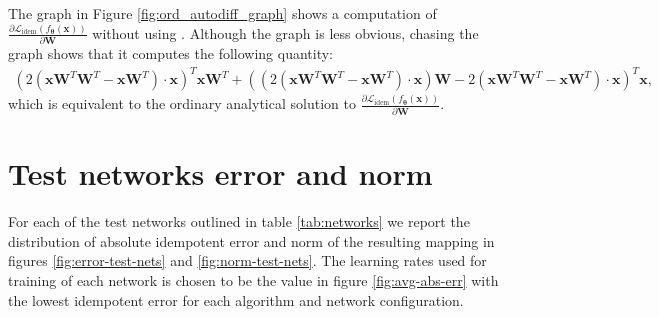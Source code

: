 \documentclass{article}
\theoremstyle{plain}
\theoremstyle{definition}
\theoremstyle{remark}
\newcommand{\vx}{\mathbf{x}}
\newcommand{\vW}{\mathbf{W}}
\newcommand{\vtheta}{\bm{\theta}}
\newcommand{\pd}[2]{\frac{\partial{#1}}{\partial{#2}}}
\begin{document}
The graph in Figure \ref{fig:ord_autodiff_graph} shows a computation of $\pd{\mathcal{L}_{\mathrm{idem}}(f_{\vtheta}(\vx))}{\vW}$ without using . Although the graph is less obvious, chasing the graph shows that it computes the following quantity:
%
\begin{align*}
    (2(\vx\vW^T\vW^T-\vx\vW^T) \cdot \vx)^T \vx\vW^T + ((2(\vx\vW^T\vW^T-\vx\vW^T) \cdot \vx) \vW - 2(\vx\vW^T\vW^T-\vx\vW^T) \cdot \vx)^T \vx,
\end{align*}
%
which is equivalent to the ordinary analytical solution to $\pd{\mathcal{L}_{\mathrm{idem}}(f_{\vtheta}(\vx))}{\vW}$.

\newpage
\section{Test networks error and norm}
\label{app:test-networks-data}

For each of the test networks outlined in table \ref{tab:networks} we report the distribution of absolute idempotent error and norm of the resulting mapping in figures \ref{fig:error-test-nets} and \ref{fig:norm-test-nets}. The learning rates used for training of each network is chosen to be the value in figure \ref{fig:avg-abs-err} with the lowest idempotent error for each algorithm and network configuration.
\end{document}
